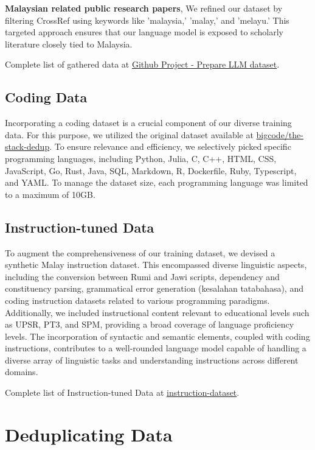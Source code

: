 \documentclass{article}
\begin{document}
\textbf{Malaysian related public research papers}, We refined our dataset by filtering CrossRef using keywords like 'malaysia,' 'malay,' and 'melayu.' This targeted approach ensures that our language model is exposed to scholarly literature closely tied to Malaysia.

Complete list of gathered data at \href{https://github.com/users/huseinzol05/projects/1}{Github Project - Prepare LLM dataset}.

\subsection{Coding Data}

Incorporating a coding dataset is a crucial component of our diverse training data. For this purpose, we utilized the original dataset available at \href{https://huggingface.co/datasets/bigcode/the-stack-dedup}{bigcode/the-stack-dedup}. To ensure relevance and efficiency, we selectively picked specific programming languages, including Python, Julia, C, C++, HTML, CSS, JavaScript, Go, Rust, Java, SQL, Markdown, R, Dockerfile, Ruby, Typescript, and YAML. To manage the dataset size, each programming language was limited to a maximum of 10GB.

\subsection{Instruction-tuned Data}

To augment the comprehensiveness of our training dataset, we devised a synthetic Malay instruction dataset. This encompassed diverse linguistic aspects, including the conversion between Rumi and Jawi scripts, dependency and constituency parsing, grammatical error generation (kesalahan tatabahasa), and coding instruction datasets related to various programming paradigms. Additionally, we included instructional content relevant to educational levels such as UPSR, PT3, and SPM, providing a broad coverage of language proficiency levels. The incorporation of syntactic and semantic elements, coupled with coding instructions, contributes to a well-rounded language model capable of handling a diverse array of linguistic tasks and understanding instructions across different domains.

Complete list of Instruction-tuned Data at \href{https://github.com/mesolitica/malaya/wiki/MaLLaM-%F0%9F%8C%99-Malaysia-Large-Language-Model#instruction-dataset}{instruction-dataset}.

\section{Deduplicating Data}
\end{document}
